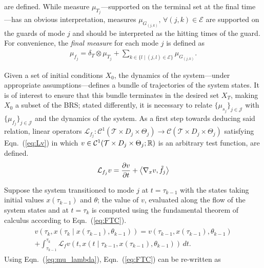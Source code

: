 are defined. While measure $\mu_{T_j}$---supported on the terminal set at the final time---has an obvious interpretation, measures $\mu_{ G_{(j,k)}},\,\forall (j,k)\in \mathcal E$ are supported on the guards of mode $j$ and should be interpreted as the hitting times of the guard.
For convenience, the {\em final measure} for each mode $j$ is defined as
\begin{align}
  \mu_{f_j}=\delta_T\otimes \mu_{T_j}+\sum_{k\in\{l\mid (j,l)\in \mathcal E\}}\mu_{ G_{(j,k)}}.
\label{eq:mu_T}
\end{align}
\normalsize
\par
Given a set of initial conditions $X_{0}$, the dynamics of the system---under appropriate assumptions---defines a bundle of trajectories of the system states. It is of interest to ensure that this bundle terminates in the desired set $X_T$, making $X_0$ a subset of the BRS; stated differently, it is necessary to relate $\{\mu_{s_j}\}_{j\in \mathcal J}$ with $\{\mu_{f_j}\}_{j\in \mathcal J}$ and the dynamics of the system. As a first step towards deducing said relation, linear operators {$\mathcal L_{ f_j}\colon \mathcal C^1(\mathcal T\times D_j\times \Theta_j)\rightarrow \mathcal C(\mathcal T\times D_j\times \Theta_j)$} satisfying Eqn.~(\ref{eq:Lv}) in which $v\in \mathcal C^1(\mathcal T\times D_j\times \Theta_j;\mathbb{R})$ is an arbitrary test function, are defined.
\begin{align}
      \mathcal L_{f_j}v=\frac{\partial v}{\partial t}+\left\langle \nabla_x v,\tilde f_j\right\rangle
    \label{eq:Lv}
\end{align}
\par
Suppose the system transitioned to mode $j$ at \mbox{$t=\tau_{k-1}$} with the states taking initial values $x(\tau_{k-1})$ and $\theta$; the value of $v$, evaluated along the flow of the system states and at $t=\tau_{k}$ is computed using the fundamental theorem of calculus according to Eqn.~(\ref{eq:FTC}).
\begin{align}
\begin{split}
    v\left(\tau_k,x\left(\tau_{k}\mid x(\tau_{k-1}),\theta_{k-1}\right)\right)=v(\tau_{k-1},x(\tau_{k-1}),\theta_{k-1})\\
    +\int_{\tau_{k-1}}^{\tau_{k}}\mathcal L_{f}v(t,x(t\mid \tau_{k-1},x(\tau_{k-1}),\theta_{k-1}))\,dt.
\end{split}
\label{eq:FTC}
\end{align}
Using Eqn.~(\ref{eq:mu_lambda}), Eqn.~(\ref{eq:FTC}) can be re-written as

